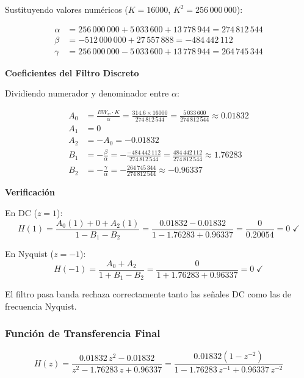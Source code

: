 Sustituyendo valores numéricos ($K = 16000$, $K^2 = 256\,000\,000$):

\begin{align}
    \alpha &= 256\,000\,000 + 5\,033\,600 + 13\,778\,944 = 274\,812\,544 \\
    \beta  &= -512\,000\,000 + 27\,557\,888 = -484\,442\,112 \\
    \gamma &= 256\,000\,000 - 5\,033\,600 + 13\,778\,944 = 264\,745\,344
\end{align}

\textbf{Coeficientes del Filtro Discreto}

Dividiendo numerador y denominador entre $\alpha$:

\begin{align}
    A_0 &= \frac{BW_w \cdot K}{\alpha} = \frac{314.6 \times 16000}{274\,812\,544} = \frac{5\,033\,600}{274\,812\,544} \approx 0.01832 \\[6pt]
    A_1 &= 0 \\[6pt]
    A_2 &= -A_0 = -0.01832 \\[6pt]
    B_1 &= -\frac{\beta}{\alpha} = -\frac{-484\,442\,112}{274\,812\,544} = \frac{484\,442\,112}{274\,812\,544} \approx 1.76283 \\[6pt]
    B_2 &= -\frac{\gamma}{\alpha} = -\frac{264\,745\,344}{274\,812\,544} \approx -0.96337
\end{align}

\textbf{Verificación}

En DC ($z = 1$):
\begin{equation}
    H(1) = \frac{A_0(1) + 0 + A_2(1)}{1 - B_1 - B_2} = \frac{0.01832 - 0.01832}{1 - 1.76283 + 0.96337} = \frac{0}{0.20054} = 0 \;\checkmark
\end{equation}

En Nyquist ($z = -1$):
\begin{equation}
    H(-1) = \frac{A_0 + A_2}{1 + B_1 - B_2} = \frac{0}{1 + 1.76283 + 0.96337} = 0 \;\checkmark
\end{equation}

El filtro pasa banda rechaza correctamente tanto las señales DC como las de frecuencia Nyquist.

\subsubsection{Función de Transferencia Final}

\begin{equation}
    \boxed{H(z) = \frac{0.01832\,z^2 - 0.01832}{z^2 - 1.76283\,z + 0.96337} = \frac{0.01832(1 - z^{-2})}{1 - 1.76283\,z^{-1} + 0.96337\,z^{-2}}}
    \label{eq:bp_Hz}
\end{equation}

